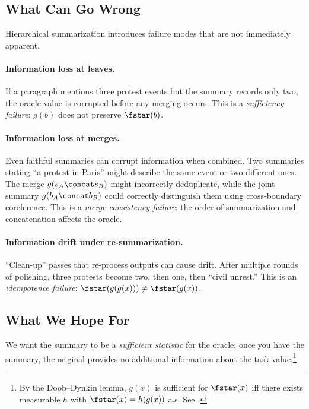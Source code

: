 \subsection{What Can Go Wrong}\label{sec:what-can-go-wrong}

Hierarchical summarization introduces failure modes that are not immediately apparent.

\paragraph{Information loss at leaves.}
If a paragraph mentions three protest events but the summary records only two, the oracle value is corrupted before any merging occurs. This is a \emph{sufficiency failure}: $g(b)$ does not preserve $\fstar(b)$.

\paragraph{Information loss at merges.}
Even faithful summaries can corrupt information when combined. Two summaries stating ``a protest in Paris'' might describe the same event or two different ones. The merge $g(s_A \concat s_B)$ might incorrectly deduplicate, while the joint summary $g(b_A \concat b_B)$ could correctly distinguish them using cross-boundary coreference. This is a \emph{merge consistency failure}: the order of summarization and concatenation affects the oracle.

\paragraph{Information drift under re-summarization.}
``Clean-up'' passes that re-process outputs can cause drift. After multiple rounds of polishing, three protests become two, then one, then ``civil unrest.'' This is an \emph{idempotence failure}: $\fstar(g(g(x))) \neq \fstar(g(x))$.

\subsection{What We Hope For}\label{sec:what-we-hope-for}

We want the summary to be a \emph{sufficient statistic} for the oracle: once you have the summary, the original provides no additional information about the task value.\footnote{By the Doob--Dynkin lemma, $g(x)$ is sufficient for $\fstar(x)$ iff there exists measurable $h$ with $\fstar(x) = h(g(x))$ a.s. See \citet{Kallenberg2002FMP}.}

